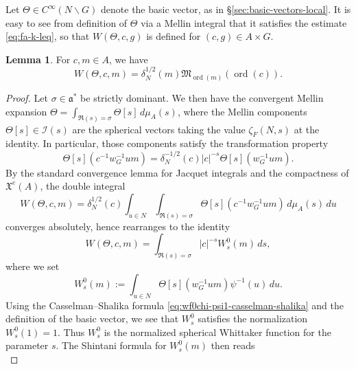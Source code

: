\documentclass[reqno]{amsart}
\DeclareMathOperator{\ord}{ord}
\theoremstyle{plain} \newtheorem{theorem} {Theorem}
\theoremstyle{definition} \newtheorem{definition} [theorem] {Definition}
\theoremstyle{itplain} %
\newtheorem{lemma}[theorem]{Lemma}
\numberwithin{equation}{section}
\numberwithin{theorem}{section}
\begin{document}
Let $\Theta \in C^\infty(N \backslash G)$ denote the basic vector, as in \S\ref{sec:basic-vectors-local}.  It is easy to see from definition of $\Theta$ via a Mellin integral that it satisfies the estimate \eqref{eq:fa-k-leq}, so that $W(\Theta,c,g)$ is defined for $(c,g) \in A \times G$.

\begin{lemma}\label{lem:sub-gln:we-have-begin}
  For $c, m \in A$, we have
  \begin{equation*}
  W(\Theta,c,m) = \delta_N^{1/2}(m) \mathfrak{M}_{\ord(m)}(\ord(c)).
\end{equation*}
\end{lemma}
\begin{proof}
  Let $\sigma \in \mathfrak{a}^*$ be strictly dominant.  We then have the convergent Mellin expansion $\Theta = \int_{\Re(s) = \sigma} \Theta[s] \, d \mu_A(s)$, where the Mellin components $\Theta[s] \in \mathcal{I}(s)$ are the spherical vectors taking the value $\zeta_F(N,s)$ at the identity.  In particular, those components satisfy the transformation property
  \begin{equation}\label{eq:f0sc-1-w_g}
    \Theta[s](c^{-1} w^{-1}_G u m)
    =
    \delta_N^{-1/2}(c) |c|^{- s} \Theta[s](w^{-1}_G u m).
  \end{equation}
  By the standard convergence lemma for Jacquet integrals \cite[\S10.1.2]{MR1170566} and the compactness of $\mathfrak{X}^e(A)$, the double integral
  \begin{equation*}
    W(\Theta, c, m) = \delta_N^{1/2}(c) \int _{u \in N} \int _{\Re(s) = \sigma } \Theta[s](c^{-1} w^{-1}_G u m) \, d \mu_A(s) \, d u
  \end{equation*}
  converges absolutely, hence rearranges to the identity
  \begin{equation*}
    W(\Theta,c,m) =
    \int _{\Re(s) = \sigma }
    |c|^{-s}
    W_s^0(m)
    \, d s,
  \end{equation*}
  where we set
  \begin{equation*}
    W_s^0(m) := \int _{u \in N} \Theta[s](w^{-1}_G u m) \psi^{-1}(u) \, d u.
  \end{equation*}
  Using the Casselman--Shalika formula \eqref{eq:wf0chi-psi1-casselman-shalika} and the definition of the basic vector, we see that $W_s^0$ satisfies the normalization $W_s^0(1) = 1$.  Thus $W_s^0$ is the normalized spherical Whittaker function for the parameter $s$.  The Shintani formula \cite{MR407208} for $W_s^0(m)$ then reads
  \begin{equation*}

\end{equation*}
\end{proof}
\end{document}
